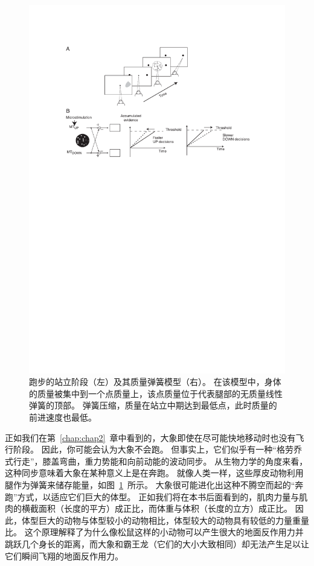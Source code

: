 \begin{figure}[!htb]
	\centering
	\includegraphics[width=1.0\linewidth]{chap3/3_5}
	\caption{跑步的站立阶段（左）及其质量弹簧模型（右）。
		在该模型中，身体的质量被集中到一个点质量上，该点质量位于代表腿部的无质量线性弹簧的顶部。
		弹簧压缩，质量在站立中期达到最低点，此时质量的前进速度也最低。 \label{fig:3_5}}
\end{figure}


正如我们在第~\ref{chap:chap2}~章中看到的，大象即使在尽可能快地移动时也没有飞行阶段。
因此，你可能会认为大象不会跑。
但事实上，它们似乎有一种“格劳乔式行走”，膝盖弯曲，重力势能和向前动能的波动同步。
从生物力学的角度来看，这种同步意味着大象在某种意义上是在奔跑。
就像人类一样，这些厚皮动物利用腿作为弹簧来储存能量，如图~\ref{fig:3_5}~所示。
大象很可能进化出这种不腾空而起的“奔跑”方式，以适应它们巨大的体型。
正如我们将在本书后面看到的，肌肉力量与肌肉的横截面积（长度的平方）成正比，而体重与体积（长度的立方）成正比。
因此，体型巨大的动物与体型较小的动物相比，体型较大的动物具有较低的力量重量比。
这个原理解释了为什么像松鼠这样的小动物可以产生很大的地面反作用力并跳跃几个身长的距离，而大象和霸王龙（它们的大小大致相同）却无法产生足以让它们瞬间飞翔的地面反作用力。












